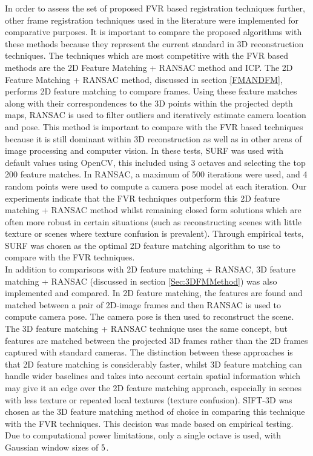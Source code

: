 
In order to assess the set of proposed FVR based registration techniques further, other frame registration techniques used in the literature were implemented for comparative purposes. It is important to compare the proposed algorithms with these methods because they represent the current standard in 3D reconstruction techniques. The techniques which are most competitive with the FVR based methods are the 2D Feature Matching + RANSAC method and ICP. The 2D Feature Matching + RANSAC method, discussed in section \ref{FMANDFM}, performs 2D feature matching to compare frames. Using these feature matches along with their correspondences to the 3D points within the projected depth maps, RANSAC is used to filter outliers and iteratively estimate camera location and pose. This method is important to compare with the FVR based techniques because it is still dominant within 3D reconstruction as well as in other areas of image processing and computer vision. In these tests, SURF was used with default values using OpenCV, this included using 3 octaves and selecting the top 200 feature matches. In RANSAC, a maximum of 500 iterations were used, and 4 random points were used to compute a camera pose model at each iteration. Our experiments indicate that the FVR techniques outperform this 2D feature matching + RANSAC method whilst remaining closed form solutions which are often more robust in certain situations (such as reconstructing scenes with little texture or scenes where texture confusion is prevalent). Through empirical tests, SURF was chosen as the optimal 2D feature matching algorithm to use to compare with the FVR techniques. \\ 


In addition to comparisons with 2D feature matching + RANSAC, 3D feature matching + RANSAC (discussed in section \ref{Sec:3DFMMethod}) was also implemented and compared. In 2D feature matching, the features are found and matched between a pair of 2D-image frames and then RANSAC is used to compute camera pose. The camera pose is then used to reconstruct the scene. The 3D feature matching + RANSAC technique uses the same concept, but features are matched between the projected 3D frames rather than the 2D frames captured with standard cameras. The distinction between these approaches is that 2D feature matching is considerably faster, whilst 3D feature matching can handle wider baselines and takes into account certain spatial information which may give it an edge over the 2D feature matching approach, especially in scenes with less texture or repeated local textures (texture confusion). SIFT-3D was chosen as the 3D feature matching method of choice in comparing this technique with the FVR techniques. This decision was made based on empirical testing. Due to computational power limitations, only a single octave is used, with Gaussian window sizes of $5 \time 5$. \\

